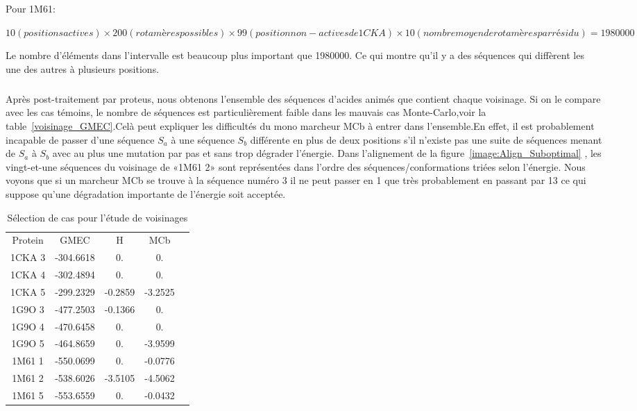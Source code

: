 Pour 1M61:

$10 (positions actives) \times 200 (rotamères possibles) \times 99 (position non-actives de 1CKA) \times 10 (nombre moyen de rotamères par résidu)=1980000 $

Le nombre d'éléments dans l'intervalle est beaucoup plus important que 1980000. Ce qui montre qu'il y a des séquences qui diffèrent les une des autres à plusieurs positions.
\subparagraph{}
\label{para:vois_MCb}
Après post-traitement par proteus, nous obtenons l'ensemble des séquences d'acides animés que contient chaque voisinage. Si on le compare avec les cas témoins, le nombre de séquences est particulièrement faible dans les mauvais cas Monte-Carlo,voir la table~\ref{voisinage_GMEC}.Celà peut expliquer les difficultés du mono marcheur MCb à entrer dans l'ensemble.En effet, il est probablement incapable de passer d'une séquence $S_a$ à une séquence $S_b$ différente en plus de deux positions s'il n'existe pas une suite de séquences menant de $S_a$ à $S_b$ avec au plus une mutation par pas et sans trop dégrader l'énergie. Dans l'alignement de la figure~\ref{image:Align_Suboptimal} , les vingt-et-une séquences du voisinage de «1M61 2» sont représentées dans l'ordre des séquences/conformations triées selon l'énergie. Nous voyons que si un marcheur MCb se trouve à la séquence numéro 3 il ne peut passer en 1 que très probablement en passant par 13 ce qui suppose qu'une dégradation importante de l'énergie soit acceptée.   

    \begin{table}[h]
      \centering

      \begin{tabular}{ccccc}


        \toprule
        Protein & GMEC & H & MCb \\
        \cmidrule{1-5}
        1CKA 3 & -304.6618 & 0. & 0. \\
        1CKA 4 & -302.4894 & 0. & 0. \\
        1CKA 5 & -299.2329 & -0.2859 & -3.2525 \\
        1G9O 3 & -477.2503 & -0.1366 & 0. \\
        1G9O 4 & -470.6458 & 0. & 0. \\
        1G9O 5 & -464.8659 & 0. & -3.9599 \\
        1M61 1 & -550.0699 & 0. & -0.0776 \\
        1M61 2 & -538.6026 & -3.5105 & -4.5062 \\
        1M61 5 & -553.6559 & 0. & -0.0432 \\
        \bottomrule       
      \end{tabular}      
 \caption{Sélection de cas pour l'étude de voisinages}
\label{tab:voisinage_GMEC}      
    \end{table}




